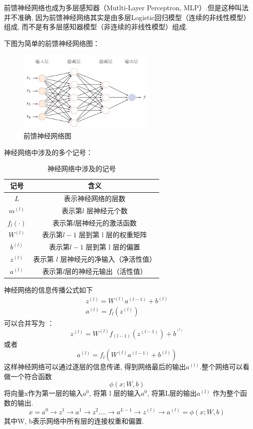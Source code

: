 \documentclass[a4paper]{article}
\begin{document}
前馈神经网络也成为多层感知器（Mutlti-Layer Perceptron, MLP）.但是这种叫法并不准确, 因为前馈神经网络其实是由多层Logistic回归模型（连续的非线性模型）组成, 而不是有多层感知器模型（非连续的非线性模型）组成.

下图为简单的前馈神经网络图：

\begin{figure}[!ht]
    \centering
    \includegraphics[width=0.6\textwidth]{FNN}
    \caption{前馈神经网络图}
\end{figure} 


神经网络中涉及的多个记号：
\begin{table}[!ht]
    \renewcommand{\arraystretch}{1.35}  
    \centering
    \begin{tabular}{cc}
        \toprule
        记号 & 含义 \\
        \midrule
        $L$ &表示神经网络的层数\\
$m^{(l)}$&表示第$ l$ 层神经元个数\\
$f_l ( \cdot ) $&表示第$ l $层神经元的激活函数\\
$W^{(l)}$   &表示第$ l-1$ 层到第 l 层的权重矩阵\\
$b^{(l)}$   &表示第$ l-1$ 层到第 l 层的偏置\\
$z^{(l)}$   &表示第 $l$ 层神经元的净输入（净活性值）\\
$a^{(l)}$   &表示第$l$层的神经元输出（活性值）\\
        \bottomrule
    \end{tabular}
\label{tabel:NerualNetwork_mark}
\caption{神经网络中涉及的记号}
\end{table}

神经网络的信息传播公式如下 
\begin{gather*}
 z^{(l)} = W^{(l)}   a^{(l-1)} + b^{(l)}\\
 a^{(l)} = f_l(z^{(l)})
\end{gather*} 
 可以合并写为 ：
$$z^{(l)}=W^{(l)} f_{(l-1)} (z^{(l-1)})+b^{^{(l)}}  $$
或者 
$$a^{(l)} = f_l(W^{(l)} a^{(l-1)} + b^{(l)})$$
这样神经网络可以通过逐层的信息传递, 得到网络最后的输出$a^{(l)}$.整个网络可以看做一个符合函数$$\phi (x; W, b)$$
将向量x作为第一层的输入$a^0$, 将第 l 层的输入$a^0$,  将第L层的输出$a^{(l)}$ 作为整个函数的输出.
$$ x = a^0 \rightarrow z^1 \rightarrow a^1 \rightarrow z^2 .... \rightarrow a^{L-1} \rightarrow z^{(l)} \rightarrow a^{(l)} = \phi (x;W, b)$$
其中W,  b表示网络中所有层的连接权重和偏置. 
\end{document}
